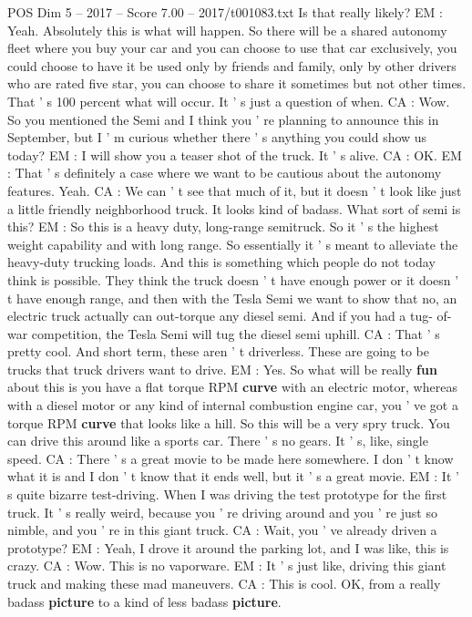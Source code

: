 \begin{textsample}{POS Dim 5 – 2017 – Score 7.00 – 2017/t001083.txt}
Is that really likely?
EM : Yeah.
Absolutely this is what will happen.
So there will be a shared autonomy fleet where you buy your car and you can choose to use that car exclusively, you could choose to have it be used only by friends and family, only by other drivers who are rated five star, you can choose to share it sometimes but not other times.
That ' s 100 percent what will occur.
It ' s just a question of when.
CA : Wow.
So you mentioned the Semi and I think you ' re planning to announce this in September, but I ' m curious whether there ' s anything you could show us today?
EM : I will show you a teaser shot of the truck.
It ' s alive.
CA : OK.
EM : That ' s definitely a case where we want to be cautious about the autonomy features.
Yeah.
CA : We can ' t see that much of it, but it doesn ' t look like just a little friendly neighborhood truck.
It looks kind of badass.
What sort of semi is this?
EM : So this is a heavy duty, long-range semitruck.
So it ' s the highest weight capability and with long range.
So essentially it ' s meant to alleviate the heavy-duty trucking loads.
And this is something which people do not today think is possible.
They think the truck doesn ' t have enough power or it doesn ' t have enough range, and then with the Tesla Semi we want to show that no, an electric truck actually can out-torque any diesel semi.
And if you had a tug- of-war competition, the Tesla Semi will tug the diesel semi uphill.
CA : That ' s pretty cool.
And short term, these aren ' t driverless.
These are going to be trucks that truck drivers want to drive.
EM : Yes.
So what will be really \textbf{fun} about this is you have a flat torque RPM \textbf{curve} with an electric motor, whereas with a diesel motor or any kind of internal combustion engine car, you ' ve got a torque RPM \textbf{curve} that looks like a hill.
So this will be a very spry truck.
You can drive this around like a sports car.
There ' s no gears.
It ' s, like, single speed.
CA : There ' s a great movie to be made here somewhere.
I don ' t know what it is and I don ' t know that it ends well, but it ' s a great movie.
EM : It ' s quite bizarre test-driving.
When I was driving the test prototype for the first truck.
It ' s really weird, because you ' re driving around and you ' re just so nimble, and you ' re in this giant truck.
CA : Wait, you ' ve already driven a prototype?
EM : Yeah, I drove it around the parking lot, and I was like, this is crazy.
CA : Wow.
This is no vaporware.
EM : It ' s just like, driving this giant truck and making these mad maneuvers.
CA : This is cool.
OK, from a really badass \textbf{picture} to a kind of less badass \textbf{picture}.

\end{textsample}
